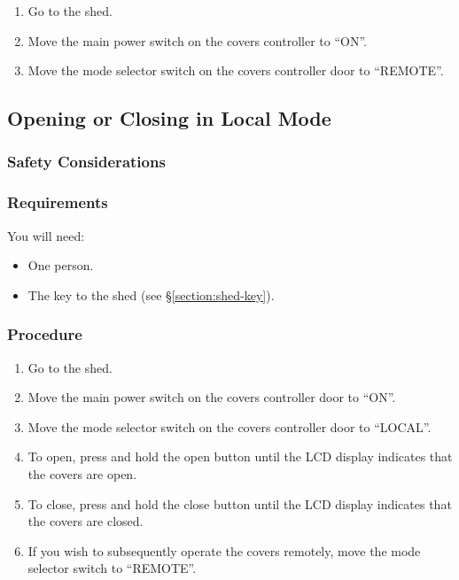 \begin{enumerate}
\item
Go to the shed.
\item
Move the main power switch on the covers controller to “ON”.
\item
Move the mode selector switch on the covers controller door to “REMOTE”.
\end{enumerate}


\subsection{Opening or Closing in Local Mode}
\label{section:covers-opening-or-closing-in-local-mode}

\subsubsection{Safety Considerations}



\subsubsection{Requirements}

You will need:

\begin{itemize}
\item One person.
\item The key to the shed (see \S\ref{section:shed-key}).
\end{itemize}

\subsubsection{Procedure}

\begin{enumerate}
\item
Go to the shed.
\item
Move the main power switch on the covers controller door to “ON”.
\item
Move the mode selector switch on the covers controller door to “LOCAL”.
\item
To open, press and hold the open button until the LCD display indicates that the covers are open.
\item
To close, press and hold the close button until the LCD display indicates that the covers are closed.
\item
If you wish to subsequently operate the covers remotely, move the mode selector switch to “REMOTE”.
\end{enumerate}

